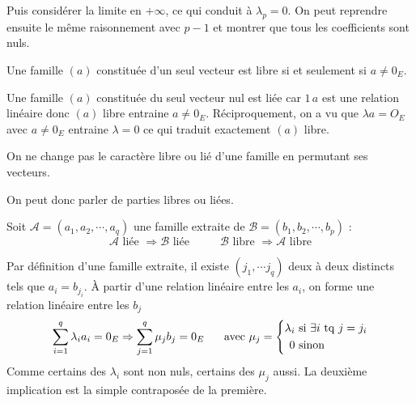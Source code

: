 Puis considérer la limite en $+\infty$, ce qui conduit à $\lambda_p=0$. On peut reprendre ensuite le même raisonnement avec $p-1$ et montrer que tous les coefficients sont nuls.
\begin{propn}
 Une famille $(a)$ constituée d'un seul vecteur est libre si et seulement si $a\neq 0_E$.
\end{propn}
\begin{demo}
 Une famille $(a)$ constituée du seul vecteur nul est liée car $1\,a$ est une relation linéaire donc $(a)$ libre entraine $a\neq 0_E$.\newline
 Réciproquement, on a vu que $\lambda a = O_E$ avec $a\neq 0_E$ entraine $\lambda=0$ ce qui traduit exactement $(a)$ libre.
\end{demo}

\begin{propn}
 On ne change pas le caractère libre ou lié d'une famille en permutant ses vecteurs.
\end{propn}
On peut donc parler de parties libres ou liées.
\begin{propn}
 Soit $\mathcal{A}=(a_1,a_2,\cdots,a_q)$ une famille extraite de $\mathcal{B}=(b_1,b_2,\cdots,b_p)$ :
\begin{displaymath}
 \mathcal{A} \text{ liée } \Rightarrow \mathcal{B} \text{ liée } \hspace{1cm}
 \mathcal{B} \text{ libre } \Rightarrow \mathcal{A} \text{ libre}
\end{displaymath}
\end{propn}
\begin{demo}
 Par définition d'une famille extraite, il existe $(j_1,\cdots j_q)$ deux à deux distincts tels que $a_i = b_{j_i}$. \`A partir d'une relation linéaire entre les $a_i$, on forme une relation linéaire entre les $b_j$
 \begin{displaymath}
 \sum_{i=1}^q \lambda_i a_i = 0_E \Rightarrow \sum_{j=1}^q \mu_j b_j = 0_E \hspace{0.5cm} \text{ avec }
 \mu_j = 
 \left\lbrace 
 \begin{aligned}
   \lambda_i &\text{ si } \exists i \text{ tq } j = j_i \\
   0 &\text{ sinon}
 \end{aligned}
\right. 
 \end{displaymath}
Comme certains des $\lambda_i$ sont non nuls, certains des $\mu_j$ aussi.\newline
La deuxième implication est la simple contraposée de la première.
\end{demo}

